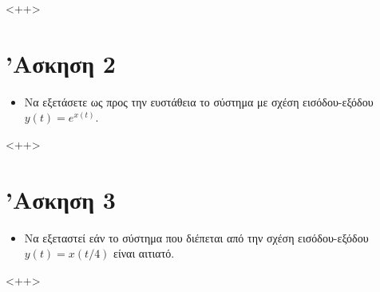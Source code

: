 \documentclass{article}
\begin{document}
<++>

\section{'Ασκηση 2}

\begin{itemize}
        \item Να εξετάσετε ως προς την ευστάθεια το σύστημα με σχέση
                εισόδου-εξόδου $y(t) = e^{x(t)}$.
\end{itemize}

<++>

\section{'Ασκηση 3}

\begin{itemize}
        \item Να εξεταστεί εάν το σύστημα που διέπεται από την σχέση
                εισόδου-εξόδου $y(t) = x(t/4)$ είναι αιτιατό.
\end{itemize}

<++>
\end{document}
